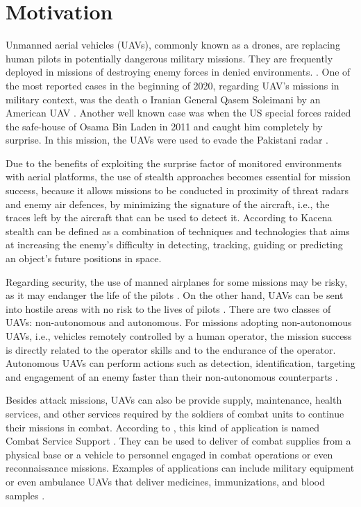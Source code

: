 \section{Motivation}

Unmanned aerial vehicles (UAVs), commonly known as a drones, are replacing human pilots in potentially dangerous military missions. They are frequently deployed in missions of destroying enemy forces in denied environments. \cite{westra_2009, kacena1995}. One of the most reported cases in the beginning of 2020, regarding UAV's missions in military context, was the death o Iranian General Qasem Soleimani by an American UAV \cite{sarker_2020}. Another well known case was when the US special forces raided the safe-house of Osama Bin Laden in 2011 and caught him completely by surprise. In this mission, the UAVs were used to evade the Pakistani radar \cite{drew_2011}.

Due to the benefits of exploiting the surprise factor of monitored environments with aerial platforms, the use of stealth approaches becomes essential for mission success, because it allows missions to be conducted in proximity of threat radars and enemy air defences, by minimizing the signature of the aircraft, i.e., the traces left by the aircraft that can be used to detect it. According to Kacena \cite{kacena1995} stealth can be defined as a combination of techniques and technologies that aims at increasing the enemy's difficulty in detecting, tracking, guiding or predicting an object's future positions in space.

Regarding security, the use of manned airplanes for some missions may be risky, as it may endanger the life of the pilots \cite{venancio_2007}. On the other hand, UAVs can be sent into hostile areas with no risk to the lives of pilots \cite{mod_2011, foust_2012}. There are two classes of UAVs: non-autonomous and autonomous. For missions adopting non-autonomous UAVs, i.e., vehicles remotely controlled by a human operator, the mission success is directly related to the operator skills and to the endurance of the operator. Autonomous UAVs can perform actions such as detection, identification, targeting and engagement of an enemy faster than their non-autonomous counterparts \cite{bellamy_2015}.

Besides attack missions, UAVs can also be provide supply, maintenance, health services, and other services required by the soldiers of combat units to continue their missions in combat. According to \citeauthor{aeronautica_2012}, this kind of application is named Combat Service Support \cite{aeronautica_2012}. They can be used to deliver of combat supplies from a physical base or a vehicle to personnel engaged in combat operations or even reconnaissance missions. Examples of applications can include military equipment or even ambulance UAVs that deliver medicines, immunizations, and blood samples \cite{amukele_2017}. 

